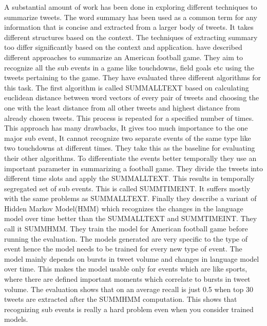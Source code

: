 A substantial amount of work has been done in exploring different techniques to summarize tweets. The word summary has been used as a common term for any information that is concise and extracted from a larger body of tweets. It takes different structures based on the context. The techniques of extracting summary too differ significantly based on the context and application. \citet{DBLP:conf/icwsm/ChakrabartiP11} have described different approaches to summarize an American football game. They aim to recognize all the sub events in a game like touchdowns, field goals etc using the tweets pertaining to the game. They have evaluated three different algorithms for this task. The first algorithm is called SUMMALLTEXT based on calculating euclidean distance between word vectors of every pair of tweets and choosing the one with the least distance from all other tweets and highest distance from already chosen tweets. This process is repeated for a specified number of times. This approach has many drawbacks, It gives too much importance to the one major sub event, It cannot recognize two separate events of the same type like two touchdowns at different times. They take this as the baseline for evaluating their other algorithms. To differentiate the events better temporally they use an important parameter in summarizing a football game. They divide the tweets into different time slots and apply the SUMMALLTEXT. This results in temporally segregated set of sub events. This is called SUMMTIMEINT. It suffers mostly with the same problems as SUMMALLTEXT. Finally they describe a variant of Hidden Markov Model(HMM) which recognizes the changes in the language model over time better than the SUMMALLTEXT and SUMMTIMEINT. They call it SUMMHMM. They train the model for American football game before running the evaluation. The models generated are very specific to the type of event hence the model needs to be trained for every new type of event. The model mainly depends on bursts in tweet volume and changes in language model over time. This makes the model usable only for events which are like sports, where there are defined important moments which correlate to bursts in tweet volume. The evaluation shows that on an average recall is just 0.5 when top 30 tweets are extracted after the SUMMHMM computation. This shows that recognizing sub events is really a hard problem even when you consider trained models.

